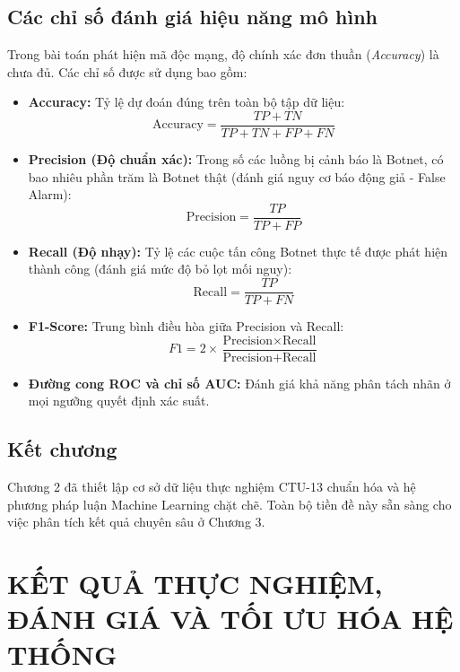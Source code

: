 \documentclass[12pt,a4paper,oneside]{report}
\begin{document}
\section{Các chỉ số đánh giá hiệu năng mô hình}
Trong bài toán phát hiện mã độc mạng, độ chính xác đơn thuần (\textit{Accuracy}) là chưa đủ. Các chỉ số được sử dụng bao gồm:
\begin{itemize}
  \item \textbf{Accuracy:} Tỷ lệ dự đoán đúng trên toàn bộ tập dữ liệu:
  \begin{equation}
    \text{Accuracy} = \frac{TP + TN}{TP + TN + FP + FN}
  \end{equation}
  \item \textbf{Precision (Độ chuẩn xác):} Trong số các luồng bị cảnh báo là Botnet, có bao nhiêu phần trăm là Botnet thật (đánh giá nguy cơ báo động giả - False Alarm):
  \begin{equation}
    \text{Precision} = \frac{TP}{TP + FP}
  \end{equation}
  \item \textbf{Recall (Độ nhạy):} Tỷ lệ các cuộc tấn công Botnet thực tế được phát hiện thành công (đánh giá mức độ bỏ lọt mối nguy):
  \begin{equation}
    \text{Recall} = \frac{TP}{TP + FN}
  \end{equation}
  \item \textbf{F1-Score:} Trung bình điều hòa giữa Precision và Recall:
  \begin{equation}
    F1 = 2 \times \frac{\text{Precision} \times \text{Recall}}{\text{Precision} + \text{Recall}}
  \end{equation}
  \item \textbf{Đường cong ROC và chỉ số AUC:} Đánh giá khả năng phân tách nhãn ở mọi ngưỡng quyết định xác suất.
\end{itemize}

\section{Kết chương}
Chương 2 đã thiết lập cơ sở dữ liệu thực nghiệm CTU-13 chuẩn hóa và hệ phương pháp luận Machine Learning chặt chẽ. Toàn bộ tiền đề này sẵn sàng cho việc phân tích kết quả chuyên sâu ở Chương 3.

\chapter{KẾT QUẢ THỰC NGHIỆM, ĐÁNH GIÁ VÀ TỐI ƯU HÓA HỆ THỐNG}
\end{document}
